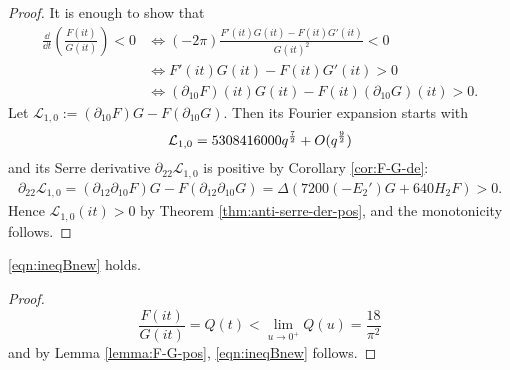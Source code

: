 \begin{proof}
It is enough to show that
\begin{align}
    \frac{\dd}{\dd t} \left(\frac{F(it)}{G(it)}\right) < 0 &\Leftrightarrow (- 2\pi) \frac{F'(it)G(it) - F(it) G'(it)}{G(it)^{2}} < 0 \\
    &\Leftrightarrow F'(it) G(it) - F(it) G'(it) > 0 \\
    &\Leftrightarrow (\partial_{10}F)(it) G(it) - F(it) (\partial_{10}G)(it) > 0.
\end{align}
Let $\mathcal{L}_{1, 0} := (\partial_{10}F) G - F (\partial_{10} G)$.
Then its Fourier expansion starts with
\begin{equation}
    \mathcal{L}_{1, 0} = 5308416000 q^{\frac{7}{2}} + O(q^{\frac{9}{2}}) \notag
\end{equation}
and its Serre derivative $\partial_{22} \mathcal{L}_{1, 0}$ is positive by Corollary \ref{cor:F-G-de}:
\begin{align}
    \partial_{22} \mathcal{L}_{1, 0} = (\partial_{12} \partial_{10} F) G - F (\partial_{12}\partial_{10} G)
    = \Delta (7200 (-E_{2}') G + 640 H_2 F) > 0.
\end{align}
Hence $\mathcal{L}_{1, 0}(it) > 0$ by Theorem \ref{thm:anti-serre-der-pos}, and the monotonicity follows.
\end{proof}


\begin{corollary}\label{cor:ineqBnew} 
\eqref{eqn:ineqBnew} holds.
\end{corollary}
\begin{proof}
\begin{equation}
    \frac{F(it)}{G(it)} = Q(t) < \lim_{u \to 0^+} Q(u) = \frac{18}{\pi^2}
\end{equation}
and by Lemma \ref{lemma:F-G-pos}, \eqref{eqn:ineqBnew} follows.
\end{proof}


